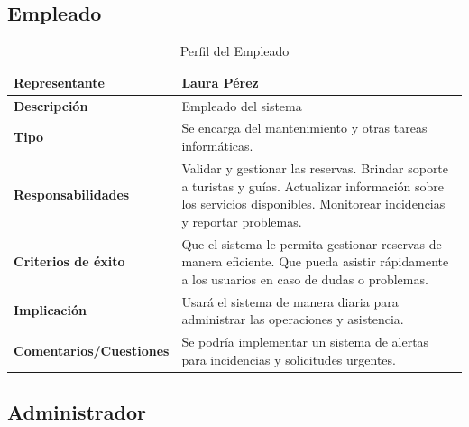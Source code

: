 \subsection*{Empleado}

\begin{table}[H]
\centering
\begin{tabular}{|p{5cm}|p{10cm}|}
\hline
\rowcolor[HTML]{CFE2F3} 
\textbf{Representante} & Laura Pérez \\ \hline
\textbf{Descripción} & Empleado del sistema \\ \hline
\textbf{Tipo} & Se encarga del mantenimiento y otras tareas informáticas. \\ \hline
\textbf{Responsabilidades} & Validar y gestionar las reservas. Brindar soporte a turistas y guías. Actualizar información sobre los servicios disponibles. Monitorear incidencias y reportar problemas. \\ \hline
\textbf{Criterios de éxito} & Que el sistema le permita gestionar reservas de manera eficiente. Que pueda asistir rápidamente a los usuarios en caso de dudas o problemas. \\ \hline
\textbf{Implicación} & Usará el sistema de manera diaria para administrar las operaciones y asistencia. \\ \hline
\textbf{Comentarios/Cuestiones} & Se podría implementar un sistema de alertas para incidencias y solicitudes urgentes. \\ \hline
\end{tabular}
\caption{Perfil del Empleado}
\label{tab:perfil_empleado}
\end{table}


\subsection*{Administrador}

